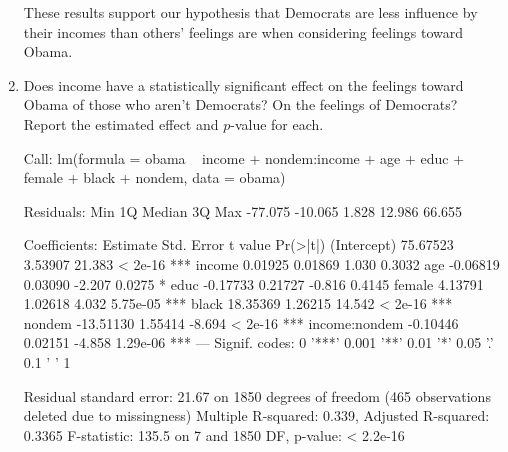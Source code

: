 \documentclass[12pt]{article}
\begin{document}
\begin{enumerate}
These results support our hypothesis that Democrats are less influence by their incomes than others' feelings are when considering feelings toward Obama.

\item Does income have a statistically significant effect on the feelings toward Obama of those who aren't Democrats?  On the feelings of Democrats?  Report the estimated effect and $p$-value for each.\\

\begin{Schunk}
\begin{Soutput}
Call:
lm(formula = obama ~ income + nondem:income + age + educ + female + 
    black + nondem, data = obama)

Residuals:
    Min      1Q  Median      3Q     Max 
-77.075 -10.065   1.828  12.986  66.655 

Coefficients:
               Estimate Std. Error t value Pr(>|t|)    
(Intercept)    75.67523    3.53907  21.383  < 2e-16 ***
income          0.01925    0.01869   1.030   0.3032    
age            -0.06819    0.03090  -2.207   0.0275 *  
educ           -0.17733    0.21727  -0.816   0.4145    
female          4.13791    1.02618   4.032 5.75e-05 ***
black          18.35369    1.26215  14.542  < 2e-16 ***
nondem        -13.51130    1.55414  -8.694  < 2e-16 ***
income:nondem  -0.10446    0.02151  -4.858 1.29e-06 ***
---
Signif. codes:  0 '***' 0.001 '**' 0.01 '*' 0.05 '.' 0.1 ' ' 1

Residual standard error: 21.67 on 1850 degrees of freedom
  (465 observations deleted due to missingness)
Multiple R-squared:  0.339,	Adjusted R-squared:  0.3365 
F-statistic: 135.5 on 7 and 1850 DF,  p-value: < 2.2e-16
\end{Soutput}
\end{Schunk}


\end{enumerate}
\end{document}
